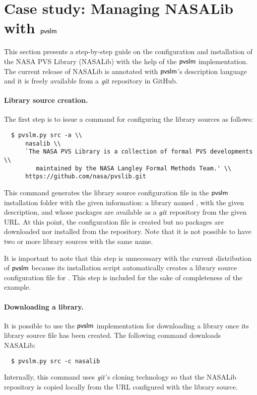 \section{Case study: Managing NASALib with $\textsf{pvslm}$}
\label{sec.nasalib}

This section presents a step-by-step guide on the configuration and
installation of the NASA PVS Library (NASALib) with the help of the
$\textsf{pvslm}$ implementation. The current release of NASALib is annotated
with $\textsf{pvslm}$'s description language and it is freely available from a
$\textit{git}$ repository in GitHub.

\paragraph{Library source creation.}
The first step is to issue a command for configuring the library sources
as follows:
%
{\small\begin{verbatim}
  $ pvslm.py src -a \\
      nasalib \\
      `The NASA PVS Library is a collection of formal PVS developments \\
         maintained by the NASA Langley Formal Methods Team.' \\
      https://github.com/nasa/pvslib.git
\end{verbatim}}
%
\noindent This command generates the library source configuration file
in the $\textsf{pvslm}$ installation folder with the given information: a
library named , with the given description, and whose
packages are available as a $\textit{git}$ repository from the given URL. At
this point, the configuration file is created but no packages are
downloaded nor installed from the repository. Note that it is not
possible to have two or more library sources with the same name.

It is important to note that this step is unnecessary with the current
distribution of $\textsf{pvslm}$ because its installation script automatically
creates a library source configuration file for . This
step is included for the sake of completeness of the example.

\paragraph{Downloading a library.} It is possible to use the $\textsf{pvslm}$
implementation for downloading a library once its library source file
has been created. The following command downloads NASALib:
%
{\small\begin{verbatim}
  $ pvslm.py src -c nasalib
\end{verbatim}}
%
Internally, this command uses $\textit{git}$'s cloning technology so that the
NASALib repository is copied locally from the URL configured with the
library source.

